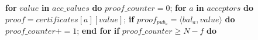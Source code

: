 \begin{algorithm}
\begin{algorithmic}[1]
		\State \hspace{\algorithmicindent}\hspace{\algorithmicindent}\hspace{\algorithmicindent} 
		\textbf{for} $value$ \textbf{in} $acc\_values$ \textbf{do}
		\State 
		\hspace{\algorithmicindent}\hspace{\algorithmicindent}\hspace{\algorithmicindent}\hspace{\algorithmicindent} $proof\_counter = 0$;
		\State \hspace{\algorithmicindent}\hspace{\algorithmicindent}\hspace{\algorithmicindent}\hspace{\algorithmicindent} \textbf{for} $a$ \textbf{in} $acceptors$ \textbf{do}
		\State 
		\hspace{\algorithmicindent}\hspace{\algorithmicindent}\hspace{\algorithmicindent}\hspace{\algorithmicindent}\hspace{\algorithmicindent} 
		$proof = certificates[a][value]$;
		\State \hspace{\algorithmicindent}\hspace{\algorithmicindent}\hspace{\algorithmicindent}\hspace{\algorithmicindent}\hspace{\algorithmicindent} \textbf{if} $proof_{pub_a} = \langle bal_a, value \rangle$ \textbf{do}
		\State \hspace{\algorithmicindent}\hspace{\algorithmicindent}\hspace{\algorithmicindent}\hspace{\algorithmicindent}\hspace{\algorithmicindent}\hspace{\algorithmicindent} $proof\_counter \mathrel{+{=}} 1$;
		\State \hspace{\algorithmicindent}\hspace{\algorithmicindent}\hspace{\algorithmicindent}\hspace{\algorithmicindent} \textbf{end for}
		\State
		\State \hspace{\algorithmicindent}\hspace{\algorithmicindent}\hspace{\algorithmicindent}\hspace{\algorithmicindent} \textbf{if} $proof\_counter \geq N-f$ \textbf{do}

\end{algorithmic}
\end{algorithm}
